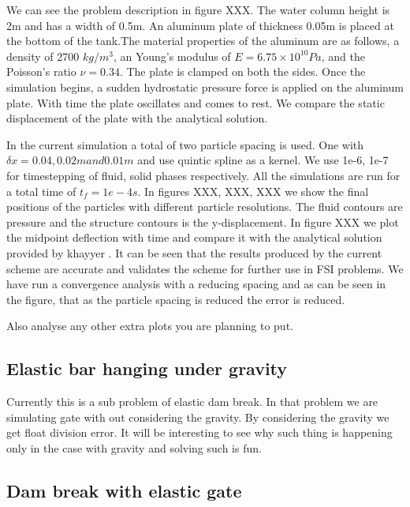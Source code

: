 \documentclass[preprint,12pt]{elsarticle}
\begin{document}
We can see the problem description in figure XXX. The water column height is
2m and has a width of 0.5m. An aluminum plate of thickness 0.05m is placed at
the bottom of the tank.The material properties of the aluminum are as follows,
a density of 2700 $kg/m^3$, an Young’s modulus of $E = 6.75 \times 10^{10} Pa$,
and the Poisson’s ratio $\nu = 0.34$. The plate is clamped on both the
sides. Once the simulation begins, a sudden hydrostatic pressure force is
applied on the aluminum plate. With time the plate oscillates and comes to
rest. We compare the static displacement of the plate with the analytical
solution.

In the current simulation a total of two particle spacing is used. One with
$\delta x = 0.04 , 0.02m and 0.01 m$ and use quintic spline as a kernel. We
use 1e-6, 1e-7 for timestepping of fluid, solid phases respectively. All the
simulations are run for a total time of $t_f = 1e-4s$. In figures XXX, XXX,
XXX we show the final positions of the particles with different particle
resolutions. The fluid contours are pressure and the structure contours is the
y-displacement. In figure XXX we plot the midpoint deflection with time and
compare it with the analytical solution provided by khayyer . It can be seen
that the results produced by the current scheme are accurate and validates the
scheme for further use in FSI problems. We have run a convergence analysis
with a reducing spacing and as can be seen in the figure, that as the particle
spacing is reduced the error is reduced.

Also analyse any other extra plots you are planning to put.




\subsection{Elastic bar hanging under gravity}
\label{sec:elastic-bar-hanging}


Currently this is a sub problem of elastic dam break. In that problem we are
simulating gate with out considering the gravity. By considering the gravity
we get float division error. It will be interesting to see why such thing is
happening only in the case with gravity and solving such is fun.


\subsection{Dam break with elastic gate}
\label{sec:dam-break-elastic-gate}
\end{document}
